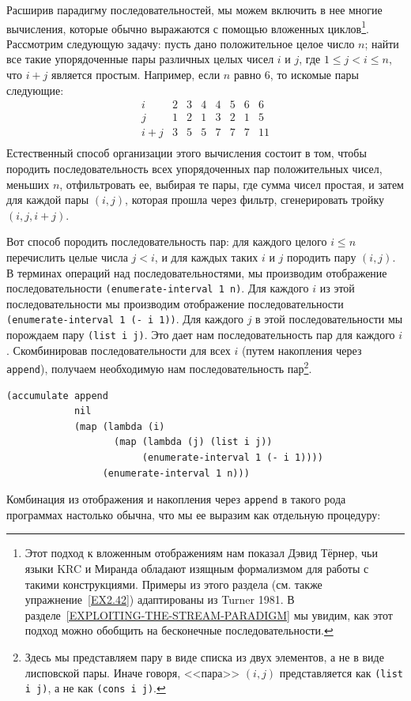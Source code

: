 Расширив парадигму последовательностей, мы можем включить 
в нее многие вычисления, которые обычно выражаются с помощью
вложенных циклов\footnote{Этот подход к вложенным отображениям нам показал Дэвид Тёрнер, чьи языки  KRC и
 Миранда обладают изящным 
формализмом для работы с такими конструкциями.  Примеры из этого
раздела (см. также упражнение~\ref{EX2.42}) адаптированы
из Turner 1981. В разделе~\ref{EXPLOITING-THE-STREAM-PARADIGM} мы увидим, 
как этот подход можно обобщить на бесконечные последовательности.
}.
Рассмотрим следующую задачу: пусть дано положительное целое число
$n$; найти все такие упорядоченные пары различных целых
чисел $i$ и $j$, где $1 \le j < i \le
n$, что $i + j$ является простым. Например, если
$n$ равно 6, то искомые пары следующие:
$$
\begin{array}{c|rrrrrrr}
  i &     2 & 3 & 4 & 4 & 5 & 6 & 6 \\
  j &     1 & 2 & 1 & 3 & 2 & 1 & 5 \\
  \hline
  i + j & 3 & 5 & 5 & 7 & 7 & 7 & 11 \\
\end{array}
$$
Естественный способ организации этого вычисления состоит в том, чтобы
породить последовательность всех упорядоченных пар положительных
чисел, меньших $n$, отфильтровать ее, выбирая те пары, где
сумма чисел простая, и затем для каждой пары $(i, j)$,
которая прошла через фильтр, сгенерировать тройку $(i, j,
i+j)$.

Вот способ породить последовательность пар: для каждого
целого $i \le n$ перечислить целые числа $j <
i$, и для каждых таких $i$ и $j$ породить
пару $(i, j)$.  В терминах операций над
последовательностями, мы производим отображение последовательности
{\tt (enumerate-interval 1 n)}. Для каждого $i$ из
этой последовательности мы производим отображение последовательности
{\tt (enumerate-interval 1 (- i 1))}. Для каждого
$j$ в этой последовательности мы порождаем пару 
{\tt (list i j)}. Это дает нам последовательность пар для
каждого $i$.  Скомбинировав последовательности для всех
$i$ (путем накопления через {\tt append}),
получаем необходимую нам последовательность пар\footnote{Здесь мы представляем пару в виде списка из двух
элементов, а не в виде лисповской пары.  Иначе говоря, <<пара>>
$(i, j)$ представляется как {\tt (list i j)}, а не
как {\tt (cons i j)}.}.

\begin{Verbatim}[fontsize=\small]
(accumulate append
            nil
            (map (lambda (i)
                   (map (lambda (j) (list i j))
                        (enumerate-interval 1 (- i 1))))
                 (enumerate-interval 1 n)))
\end{Verbatim}
Комбинация из отображения и накопления через {\tt append} в
такого рода программах настолько обычна, что мы ее выразим как
отдельную процедуру:

